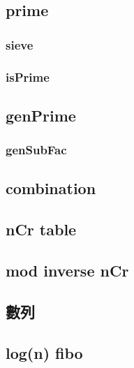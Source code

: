 \subsection{prime}
\subsubsection{sieve}


\subsubsection{isPrime}


\subsection{genPrime}


\subsubsection{genSubFac}


\subsection{combination}

\subsection{nCr table}


\subsection{mod inverse nCr}


\subsection{數列}

\subsection{log(n) fibo} %


